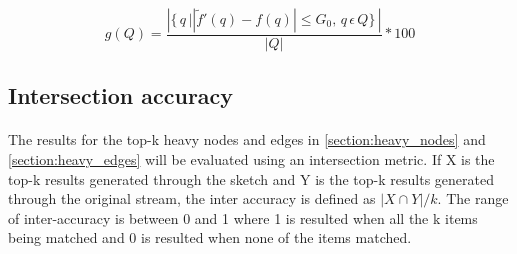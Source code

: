 \begin{equation}
    g(Q) =  \frac{\left | \{\,q\, |   \left |\tilde{f}'(q) - f(q)\right | \leq G_0, \,q \, \epsilon  \,Q\} \, \right|}{|Q|}*100
\end{equation}

\subsection{Intersection accuracy}
\label{section:metrics_inter}

\paragraph{}
The results for the top-k heavy nodes and edges in \autoref{section:heavy_nodes} and \autoref{section:heavy_edges} will be evaluated using an intersection metric\cite{fagin_comparing_2003}. If X is the top-k results generated through the sketch and Y is the top-k results generated through the original stream, the inter accuracy is defined as \(|X \cap Y|/k\). The range of inter-accuracy is between 0 and 1 where 1 is resulted when all the k items being matched and 0 is resulted when none of the items matched.